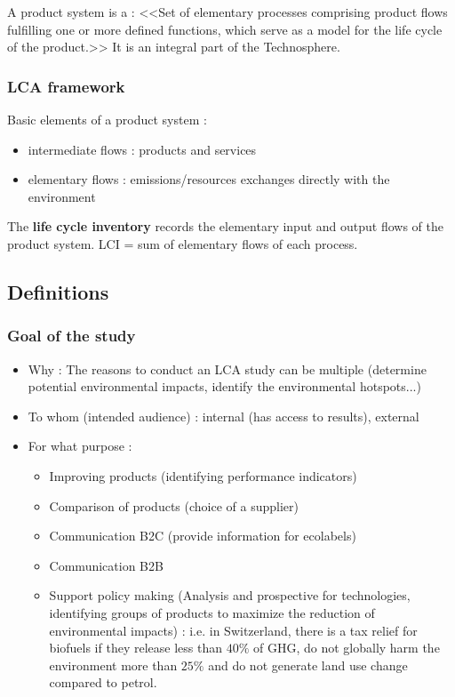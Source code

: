 \documentclass[../main.tex]{subfiles}
\begin{document}
A product system is a : <<Set of elementary processes comprising product flows fulfilling one or more defined functions, which serve as a model for the life cycle of the product.>>
It is an integral part of the Technosphere. \\

\subsubsection{LCA framework}
Basic elements of a product system : \begin{itemize}
    \item intermediate flows : products and services\\
    \item elementary flows : emissions/resources exchanges directly with the environment\\
\end{itemize}

The \textbf{life cycle inventory} records the elementary input and output flows of the product system. LCI = sum of elementary flows of each process.\\

\subsection{Definitions}
\subsubsection{Goal of the study}
\begin{itemize}
    \item Why : The reasons to conduct an LCA study can be multiple (determine potential environmental impacts, identify the environmental hotspots...)\\
    \item To whom (intended audience) : internal (has access to results), external\\
    \item For what purpose : \begin{itemize}
        \item Improving products (identifying performance indicators)\\
        \item Comparison of products (choice of a supplier)\\
        \item Communication B2C (provide information for ecolabels)\\
        \item Communication B2B\\
        \item Support policy making (Analysis and prospective for technologies, identifying groups of products to maximize the reduction of environmental impacts) : i.e. in Switzerland, there is a tax relief for biofuels if they release less than $40\%$ of GHG, do not globally harm the environment more than $25\%$ and do not generate land use change compared to petrol.\\
    \end{itemize}
\end{itemize}
\end{document}
